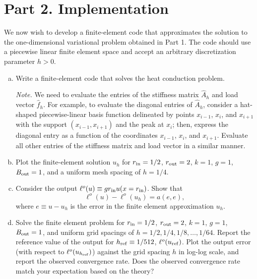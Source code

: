 \documentclass[preprint,11pt]{article}
\begin{document}
\section*{Part 2. Implementation}
We now wish to develop a finite-element code that approximates the solution to the one-dimensional variational problem obtained in Part 1. The code should use a piecewise linear finite element space and accept an arbitrary discretization parameter $h > 0$.  
\begin{enumerate}[(a)]
\item Write a finite-element code that solves the heat conduction problem.

  \emph{Note.} We need to evaluate the entries of the stiffness matrix $\hat A_h$ and load vector $\hat f_h$.  For example, to evaluate the diagonal entries of $\hat A_h$, consider a hat-shaped piecewise-linear basis function delineated by points $x_{i-1}$, $x_i$, and $x_{i+1}$ with the support $(x_{i-1},x_{i+1})$ and the peak at $x_i$; then, express the diagonal entry as a function of the coordinates $x_{i-1}$, $x_{i}$, and $x_{i+1}$.  Evaluate all other entries of the stiffness matrix and load vector in a similar manner. 
\item Plot the finite-element solution $u_h$ for $r_{\rm in} = 1/2$, $r_{\rm out} = 2$, $k = 1$, $g = 1$, $B_{\rm out} = 1$, and a uniform mesh spacing of $h = 1/4$.  
\item Consider the output $\ell^{o}(u) \equiv g r_{\rm in} u(x = r_{\rm in})$. Show that
  \begin{equation*}
    \ell^o(u) - \ell^o(u_h) = a(e,e),
  \end{equation*}
  where $e \equiv u - u_h$ is the error in the finite element approximation $u_h$.  
\item Solve the finite element problem for $r_{\rm in} = 1/2$, $r_{\rm out} = 2$, $k = 1$, $g = 1$, $B_{\rm out} = 1$, and uniform grid spacings of $h = 1/2, 1/4, 1/8, \dots, 1/64$. Report the reference value of the output for $h_{\rm ref} \equiv 1/512$, $\ell^o(u_{\rm ref})$.  Plot the output error (with respect to $\ell^o(u_{h_{\rm ref}})$) against the grid spacing $h$ in log-log scale, and report the observed convergence rate.  Does the observed convergence rate match your expectation based on the theory?
\end{enumerate}
\end{document}
